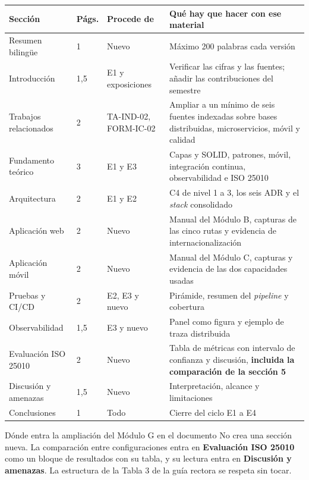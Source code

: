 \documentclass[11pt,a4paper]{article}
\begin{document}
\begin{center}
	\footnotesize
	\begin{longtable}{@{}p{3.4cm}p{1.0cm}p{2.6cm}p{7.6cm}@{}}
		\toprule
		\textbf{Sección} & \textbf{Págs.} & \textbf{Procede de} & \textbf{Qué hay que hacer con ese material} \\
		\midrule
		\endhead
		Resumen bilingüe & 1 & Nuevo & Máximo 200 palabras cada versión \\
		Introducción & 1,5 & E1 y exposiciones & Verificar las cifras y las fuentes; añadir las contribuciones del semestre \\
		Trabajos relacionados & 2 & TA-IND-02, FORM-IC-02 & Ampliar a un mínimo de seis fuentes indexadas sobre bases distribuidas, microservicios, móvil y calidad \\
		Fundamento teórico & 3 & E1 y E3 & Capas y SOLID, patrones, móvil, integración continua, observabilidad e ISO 25010 \\
		Arquitectura & 2 & E1 y E2 & C4 de nivel 1 a 3, los seis ADR y el \emph{stack} consolidado \\
		Aplicación web & 2 & Nuevo & Manual del Módulo B, capturas de las cinco rutas y evidencia de internacionalización \\
		Aplicación móvil & 2 & Nuevo & Manual del Módulo C, capturas y evidencia de las dos capacidades usadas \\
		Pruebas y CI/CD & 2 & E2, E3 y nuevo & Pirámide, resumen del \emph{pipeline} y cobertura \\
		Observabilidad & 1,5 & E3 y nuevo & Panel como figura y ejemplo de traza distribuida \\
		Evaluación ISO 25010 & 2 & Nuevo & Tabla de métricas con intervalo de confianza y discusión, \textbf{incluida la comparación de la sección 5} \\
		Discusión y amenazas & 1,5 & Nuevo & Interpretación, alcance y limitaciones \\
		Conclusiones & 1 & Todo & Cierre del ciclo E1 a E4 \\
		\bottomrule
	\end{longtable}
\end{center}

\begin{avisoBox}{Dónde entra la ampliación del Módulo G en el documento}
	No crea una sección nueva. La comparación entre configuraciones entra en \textbf{Evaluación ISO 25010} como un bloque de resultados con su tabla, y su lectura entra en \textbf{Discusión y amenazas}. La estructura de la Tabla 3 de la guía rectora se respeta sin tocar.
\end{avisoBox}
\end{document}
